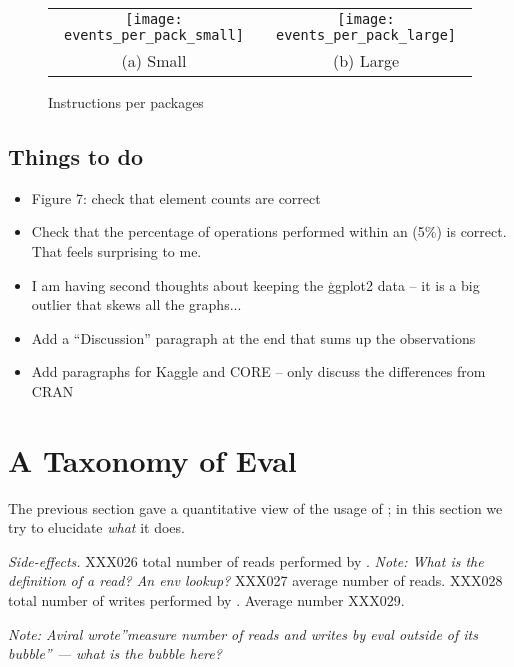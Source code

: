 \documentclass[USenglish,cleveref, autoref, thm-restate]{lipics-v2019}
\newcommand{\mypara}[1]{\medskip\noindent\emph{#1}\xspace}
\newcommand{\NOTE}[1]{{\it Note: #1}\xspace}
\begin{document}
\begin{figure}[h!]
\begin{tabular}{@{}c@{}c@{}}
\begin{minipage}{7.5cm}
 \texttt{[image: events\_per\_pack\_small]}
\end{minipage}&\begin{minipage}{7.5cm}
  \texttt{[image: events\_per\_pack\_large]}
\end{minipage}\\[-3mm]
\small (a) Small & \small (b) Large
\end{tabular}
 \caption{Instructions per packages} \label{ev}
\end{figure}

\subsection{Things to do}

\begin{itemize}
\item Figure 7: check that element counts are correct
\item Check that the percentage of operations performed within
  an \eval (5\%) is correct. That feels surprising to me.
\item I am having second thoughts about keeping the \c{ggplot2} data
  -- it is a big outlier that skews all the graphs...
\item Add a ``Discussion'' paragraph at the end that sums up the
  observations
\item Add paragraphs for Kaggle and CORE -- only discuss the
  differences from CRAN
\end{itemize}


\section{A Taxonomy of Eval}

The previous section gave a quantitative view of the usage of \eval;
in this section we try to elucidate \emph{what} it does.

\mypara{Side-effects.} XXX026 total number of reads performed by
\eval. \NOTE{What is the definition of a read? An env lookup?} XXX027
average number of reads. XXX028 total number of writes performed by
\eval. Average number XXX029.

\NOTE{Aviral wrote''measure number of reads and writes by eval outside
  of its bubble'' --- what is the bubble here?}
\end{document}
